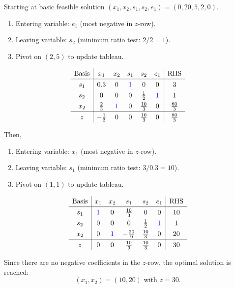 \documentclass[a4paper, 10pt]{article}
\begin{document}
\begin{tosubmit}
Starting at basic feasible solution \( (x_1, x_2, s_1, s_2, e_1) = (0, 20, 5, 2, 0) \).
\begin{enumerate}
    \item Entering variable: \( e_1 \) (most negative in \( z \)-row).
    \item Leaving variable: \( s_2 \) (minimum ratio test: \( 2/2 = 1 \)).
    \item Pivot on \( (2,5) \) to update tableau.
\end{enumerate}

\newpage

\[
\renewcommand{\arraystretch}{1.3}
\begin{array}{c|ccccc|c}
    \text{Basis} & x_1 & x_2 & s_1 & s_2 & e_1 & \text{RHS} \\
    \hline
    s_1 & 0.3 & 0 & \textcolor[HTML]{0000FF}{1} & 0 & 0 & 3 \\
    s_2 & 0 & 0 & 0 & \frac{1}{2} & \textcolor[HTML]{0000FF}{1} & 1 \\
    x_2 & \frac{2}{3} & \textcolor[HTML]{0000FF}{1} & 0 & \frac{10}{3} & 0 & \frac{80}{3} \\
    \hline
    z & -\frac{1}{3} & 0 & 0 & \frac{10}{3} & 0 & \frac{80}{3} \\
\end{array}
\]

\newpage

Then,
\begin{enumerate}
    \item Entering variable: \( x_1 \) (most negative in \( z \)-row).
    \item Leaving variable: \( s_1 \) (minimum ratio test: \( 3/0.3 = 10 \)).
    \item Pivot on \( (1,1) \) to update tableau.
\end{enumerate}
\[
\renewcommand{\arraystretch}{1.3}
\begin{array}{c|ccccc|c}
    \text{Basis} & x_1 & x_2 & s_1 & s_2 & e_1 & \text{RHS} \\
    \hline
    s_1 & \textcolor[HTML]{0000FF}{1} & 0 & \frac{10}{3} & 0 & 0 & 10 \\
    s_2 & 0 & 0 & 0 & \frac{1}{2} & \textcolor[HTML]{0000FF}{1} & 1 \\
    x_2 & 0 & \textcolor[HTML]{0000FF}{1} & -\frac{20}{9} & \frac{10}{3} & 0 & 20 \\
    \hline
    z & 0 & 0 & \frac{10}{9} & \frac{10}{3} & 0 & 30 \\
\end{array}
\]

Since there are no negative coefficients in the \( z \)-row, the optimal solution is reached:
\[ \boxed{(x_1, x_2) = (10, 20) \text{ with } z = 30}. \]
\end{tosubmit}
\end{document}
